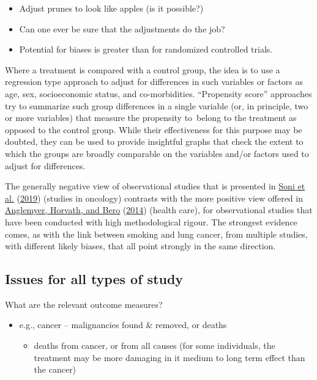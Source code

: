 \documentclass[
  10pt,
  b5paper]{book}
\providecommand{\tightlist}{%
  \setlength{\itemsep}{0pt}\setlength{\parskip}{0pt}}
\begin{document}
\begin{itemize}
\tightlist
\item
  Adjust prunes to look like apples (is it possible?)
\item
  Can one ever be sure that the adjustments do the job?
\item
  Potential for biases is greater than for randomized controlled
  trials.
\end{itemize}

Where a treatment is compared with a control group, the
idea is to use a regression type approach to adjust for
differences in such variables or factors as age, sex,
socioeconomic status, and co-morbidities.
``Propensity score'' approaches try to summarize such group
differences in a single variable (or, in principle, two
or more variables) that measure the propensity
to~belong to the treatment as opposed to the control group.
While their effectiveness for this purpose may be doubted,
they can be used to provide insightful graphs that check
the extent to which the groups are broadly comparable on
the variables and/or factors used to adjust for differences.

The generally negative view of observational studies that
is presented in \protect\hyperlink{ref-soni2019comparison}{Soni et al.} (\protect\hyperlink{ref-soni2019comparison}{2019}) (studies in oncology)
contrasts with the more positive view offered in
\protect\hyperlink{ref-anglemyer2014healthcare}{Anglemyer, Horvath, and Bero} (\protect\hyperlink{ref-anglemyer2014healthcare}{2014}) (health care), for observational
studies that have been conducted with high methodological
rigour. The strongest evidence comes, as with the link
between smoking and lung cancer, from multiple studies,
with different likely biases, that all point strongly in
the same direction.

\hypertarget{issues-for-all-types-of-study}{%
\subsection*{Issues for all types of study}\label{issues-for-all-types-of-study}}

What are the relevant outcome measures?

\begin{itemize}
\tightlist
\item
  e.g., cancer -- malignancies found \& removed, or deaths

  \begin{itemize}
  \tightlist
  \item
    deaths from cancer, or from all causes (for some individuals,
    the treatment may be more damaging in it medium to long term effect
    than the cancer)
  \end{itemize}
\end{itemize}
\end{document}
